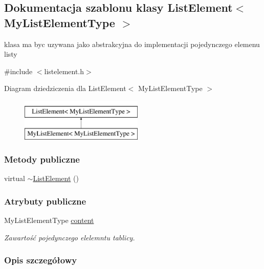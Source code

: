 \hypertarget{class_list_element}{\subsection{Dokumentacja szablonu klasy List\-Element$<$ My\-List\-Element\-Type $>$}
\label{class_list_element}
}


klasa ma byc uzywana jako abstrakcyjna do implementacji pojedynczego elemenu listy  




{\ttfamily \#include $<$listelement.\-h$>$}

Diagram dziedziczenia dla List\-Element$<$ My\-List\-Element\-Type $>$\begin{figure}[H]
\begin{center}
\leavevmode
\includegraphics[height=2.000000cm]{class_list_element}
\end{center}
\end{figure}
\subsubsection*{Metody publiczne}
\begin{DoxyCompactItemize}
\item 
virtual \hyperlink{class_list_element_a4dd3fb0cf30084815a14a23830cb7f3b}{$\sim$\-List\-Element} ()
\end{DoxyCompactItemize}
\subsubsection*{Atrybuty publiczne}
\begin{DoxyCompactItemize}
\item 
My\-List\-Element\-Type \hyperlink{class_list_element_ad4ccf390c996e7a19b6dc270875276a1}{content}
\begin{DoxyCompactList}\small\item\em Zawartość pojedynczego elelemntu tablicy. \end{DoxyCompactList}\end{DoxyCompactItemize}


\subsubsection{Opis szczegółowy}
